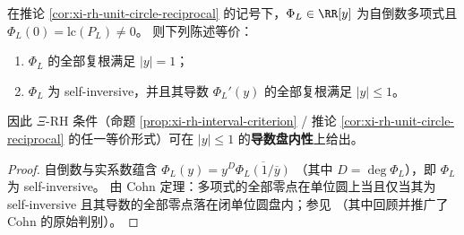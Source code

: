 \begin{proposition}\label{prop:xi-rh-cohn-derivative}
在推论 \ref{cor:xi-rh-unit-circle-reciprocal} 的记号下，\(\Phi_L\in\RR[y]\) 为自倒数多项式且 \(\Phi_L(0)=\mathrm{lc}(P_L)\neq 0\)。
则下列陈述等价：
\begin{enumerate}
  \item \(\Phi_L\) 的全部复根满足 \(|y|=1\)；
  \item \(\Phi_L\) 为 self-inversive，并且其导数 \(\Phi_L'(y)\) 的全部复根满足 \(|y|\le 1\)。
\end{enumerate}
因此 \(\Xi\)-RH 条件（命题 \ref{prop:xi-rh-interval-criterion} / 推论 \ref{cor:xi-rh-unit-circle-reciprocal} 的任一等价形式）可在 \(|y|\le 1\) 的\textbf{导数盘内性}上给出。
\end{proposition}
\begin{proof}
自倒数与实系数蕴含
\(
\Phi_L(y)=y^{D}\overline{\Phi_L(1/\overline{y})}
\)
（其中 \(D=\deg\Phi_L\)），即 \(\Phi_L\) 为 self-inversive。
由 Cohn 定理：多项式的全部零点在单位圆上当且仅当其为 self-inversive 且其导数的全部零点落在闭单位圆盘内；参见 \cite{LalinSmyth2012UnimodularitySelfInversive}（其中回顾并推广了 Cohn 的原始判别）。
\end{proof}

